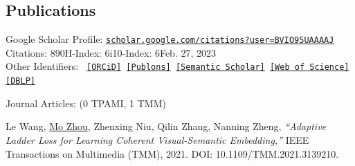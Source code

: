 \documentclass[10pt,margin,line,pifont,palatino,courier]{res}
\begin{document}
\begin{resume}



%


\section{\sc Publications}
	Google Scholar Profile:
	\href{https://scholar.google.com/citations?user=BVIO95UAAAAJ}{\small\texttt{scholar.google.com/citations?user=BVIO95UAAAAJ}}\\
	\hspace*{9.7em}Citations: 890\qquad H-Index: 6\qquad i10-Index: 6\qquad Feb. 27, 2023\\
	Other Identifiers:
	{\footnotesize\tt
	\href{https://orcid.org/0000-0003-3813-4875}{[ORCiD]}
	\href{https://publons.com/researcher/4930582/mo-zhou}{[Publons]}
	\href{https://www.semanticscholar.org/author/Mo-Zhou/2109097390}{[Semantic Scholar]}
	\href{https://www.webofscience.com/wos/author/record/AAC-2403-2022}{[Web of Science]}
    \href{https://dblp.org/pid/24/4846}{[DBLP]}
	}

{\sc Journal Articles:} \hfill(0 TPAMI, 1 TMM)\\

\begin{enumerate}[noitemsep, leftmargin=*, label={[J0{\arabic*}]}]

\item Le Wang, \underline{Mo Zhou},
\reversemarginpar{}
Zhenxing Niu, Qilin Zhang, Nanning Zheng,
\textit{``Adaptive Ladder Loss for Learning Coherent Visual-Semantic Embedding,''}
IEEE Transactions on Multimedia (TMM), 2021.
DOI: 10.1109/TMM.2021.3139210.


\end{enumerate}
\end{resume}
\end{document}
